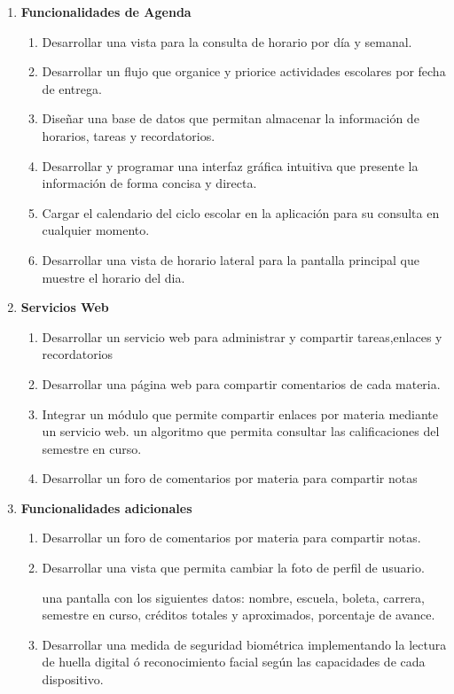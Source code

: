 \documentclass[10pt]{article}
\begin{document}
\begin{enumerate}
    \item \textbf{Funcionalidades de Agenda}
    
\begin{enumerate}
\item Desarrollar una vista para la consulta de horario por día y semanal.
\item Desarrollar un flujo que organice y priorice actividades escolares por fecha de entrega.
\item Diseñar una base de datos que permitan almacenar la información de horarios, tareas y recordatorios.
\item Desarrollar y programar una interfaz gráfica intuitiva que presente la información de forma concisa y directa.
\item Cargar el calendario del ciclo escolar en la aplicación para su consulta en cualquier momento.
\item Desarrollar una vista de horario lateral para la pantalla principal que muestre el horario del dia.
\end {enumerate}
\item \textbf{Servicios Web}
\begin{enumerate}
\item Desarrollar un servicio web para administrar y compartir tareas,enlaces y recordatorios
\item Desarrollar una página web para compartir comentarios de cada materia.
\item Integrar un módulo que permite compartir enlaces por materia mediante un servicio web.
\itemDesarrollar un algoritmo que permita consultar las calificaciones del semestre en curso.
\item Desarrollar un foro de comentarios por materia para compartir notas 
\end {enumerate}
\item \textbf{Funcionalidades adicionales}
\begin{enumerate}
\item Desarrollar un foro de comentarios por materia para compartir notas.
\item Desarrollar una vista que permita cambiar la foto de perfil de usuario.

\itemDesarrollar una pantalla con los siguientes datos: nombre, escuela, boleta, carrera, semestre en curso, créditos totales y aproximados, porcentaje de avance.

\item Desarrollar una medida de seguridad biométrica implementando la lectura de huella digital ó reconocimiento facial según las capacidades de cada dispositivo.
\end {enumerate}
\end{enumerate}
\end{document}
